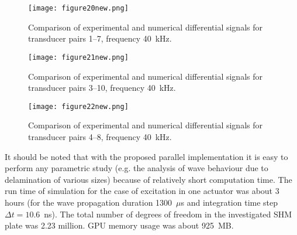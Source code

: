 \documentclass[12pt]{iopart}
\begin{document}
\begin{figure} [h!]
	\centering
	\texttt{[image: figure20new.png]}	
	\caption{Comparison of experimental and numerical differential signals for transducer pairs 1--7, frequency 40~kHz.}
	\label{fig:path1_7_diff}
\end{figure}
\begin{figure} [h!]
	\centering
	\texttt{[image: figure21new.png]}	
	\caption{Comparison of experimental and numerical differential signals for transducer pairs 3--10, frequency 40~kHz.}
	\label{fig:path3_10_diff}
\end{figure}
\begin{figure} [h!]
	\centering
	\texttt{[image: figure22new.png]}	
	\caption{Comparison of experimental and numerical differential signals for transducer pairs 4--8, frequency 40~kHz.}
	\label{fig:path4_8_diff}
\end{figure}		
It should be noted that with the proposed parallel implementation it is easy to perform any parametric study (e.g. the analysis of wave behaviour due to delamination of various sizes) because of relatively short computation time. The run time of simulation for the case of excitation in one actuator was about 3 hours (for the wave propagation duration 1300~\(\mu\)s and integration time step \(\Delta t = 10.6\)~ns). The total number of degrees of freedom in the investigated SHM plate was 2.23 million. GPU memory usage was about 925~MB.
\end{document}
